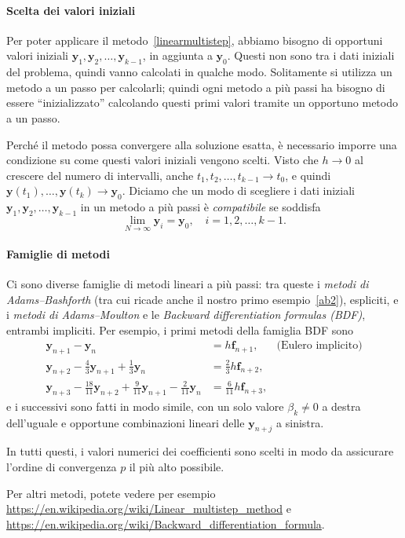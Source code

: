 \documentclass[a4paper]{report}
\theoremstyle{definiton}
\theoremstyle{remark}
\newcommand{\y}{\mathbf{y}}
\newcommand{\f}{\mathbf{f}}
\begin{document}
\paragraph{Scelta dei valori iniziali} Per poter applicare il metodo~\eqref{linearmultistep}, abbiamo bisogno di opportuni valori iniziali $\y_1,\y_2,\dots, \y_{k-1}$, in aggiunta a $\y_0$. Questi non sono tra i dati iniziali del problema, quindi vanno calcolati in qualche modo. Solitamente si utilizza un metodo a un passo per calcolarli; quindi ogni metodo a più passi ha bisogno di essere ``inizializzato'' calcolando questi primi valori tramite un opportuno metodo a un passo.

Perché il metodo possa convergere alla soluzione esatta, è necessario imporre una condizione su come questi valori iniziali vengono scelti. Visto che $h\to 0$ al crescere del numero di intervalli, anche $t_1,t_2,\dots,t_{k-1} \to t_0$, e quindi $\y(t_1),\dots,\y(t_k) \to \y_0$. Diciamo che un modo di scegliere i dati iniziali $\y_1,\y_2,\dots,\y_{k-1}$ in un metodo a più passi è \emph{compatibile} se soddisfa 
\[
\lim_{N\to\infty} \y_i = \y_0, \quad i=1,2,\dots,k-1.
\]

\paragraph{Famiglie di metodi} Ci sono diverse famiglie di metodi lineari a più passi: tra queste i \emph{metodi di Adams--Bashforth} (tra cui ricade anche il nostro primo esempio~\eqref{ab2}), espliciti, e i \emph{metodi di Adams--Moulton} e le \emph{Backward differentiation formulas (BDF)}, entrambi impliciti. Per esempio, i primi metodi della famiglia BDF sono
\begin{align*}
\y_{n+1} - \y_n &= h\f_{n+1}, & \text{(Eulero implicito)}\\
\y_{n+2} - \frac43 \y_{n+1} + \frac13 \y_n &= \frac23 h\f_{n+2},\\
\y_{n+3} - \frac{18}{11}\y_{n+2} + \frac{9}{11}\y_{n+1} - \frac{2}{11}\y_n &= \frac{6}{11}h \f_{n+3},
\end{align*}
e i successivi sono fatti in modo simile, con un solo valore $\beta_k\neq 0$ a destra dell'uguale e opportune combinazioni lineari delle $\y_{n+j}$ a sinistra.

In tutti questi, i valori numerici dei coefficienti sono scelti in modo da assicurare l'ordine di convergenza $p$ il più alto possibile.

Per altri metodi, potete vedere per esempio \url{https://en.wikipedia.org/wiki/Linear_multistep_method} e \url{https://en.wikipedia.org/wiki/Backward_differentiation_formula}.
\end{document}
